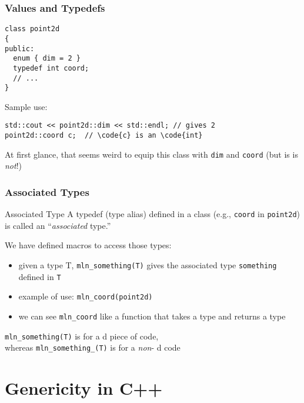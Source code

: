 \documentclass{beamer}
\newcommand{\cpp}{{C++}\xspace}
\newcommand{\kw}[1]{{\color{blue}{\texttt{#1}}}\xspace}
\newcommand{\code}[1]{{\scriptsize{\texttt{#1}}}\xspace}
\begin{document}
\begin{frame}[fragile]
  \frametitle{Values and Typedefs}


\begin{lstlisting}
class point2d
{
public:
  enum { dim = 2 }
  typedef int coord;
  // ...
}
\end{lstlisting}

Sample use:
\begin{lstlisting}
std::cout << point2d::dim << std::endl; // gives 2
point2d::coord c;  // \code{c} is an \code{int}
\end{lstlisting}

{\scriptsize
At first glance, that seems weird to equip this class with \code{dim}
and \code{coord} (but is is \emph{not}!)
}

\end{frame}



\begin{frame}
  \frametitle{Associated Types}

\begin{block}{Associated Type}
  A typedef (type alias) defined in a class (e.g., \code{coord} in
  \code{point2d}) is called an ``\emph{associated} type.''
\end{block}

\smallskip
We have defined macros to access those types:
\begin{itemize}
\item given a type T, \code{mln\_something(T)} gives the associated
  type \code{something} defined in \code{T}
\item example of use: \code{mln\_coord(point2d)}
\item we can see \code{mln\_coord} like a function that takes a type and returns a type
\end{itemize}

\smallskip

\tiny{\code{mln\_something(T)} is for a \kw{template}d piece of
  code,\\ whereas \code{mln\_something\_(T)} is for a
  \emph{non}-\kw{template}d code}

\end{frame}



\section{Genericity in \cpp}
\end{document}
